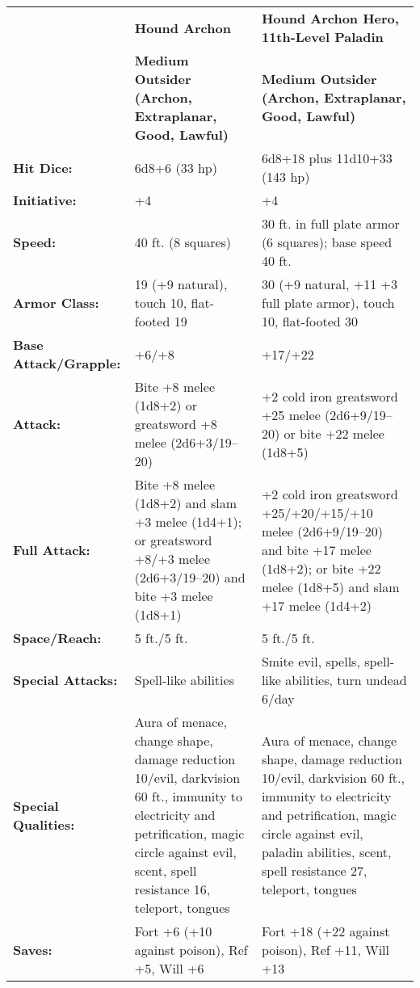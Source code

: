 \documentclass[../main.tex]{subfiles}
\begin{document}
  \begin{table*}[H]
    \centering
    \begin{tabular}{p{9em}p{12em}p{16em}}
       & \textbf{Hound Archon} & \textbf{Hound Archon Hero, 11th-Level Paladin} \\
       & \textbf{Medium Outsider (Archon, Extraplanar, Good, Lawful)} & \textbf{Medium Outsider (Archon, Extraplanar, Good, Lawful)} \\
      \rowcolor[HTML]{FFCE93}
      \textbf{Hit Dice:} & 6d8+6 (33 hp) & 6d8+18 plus 11d10+33 (143 hp) \\
      \textbf{Initiative:} & +4 & +4 \\
      \rowcolor[HTML]{FFCE93}
      \textbf{Speed:} & 40 ft. (8 squares) & 30 ft. in full plate armor (6 squares); base speed 40 ft. \\
      \textbf{Armor Class:} & 19 (+9 natural), touch 10, flat-footed 19 & 30 (+9 natural, +11 +3 full plate armor), touch 10, flat-footed 30 \\
      \rowcolor[HTML]{FFCE93}
      \textbf{Base Attack/Grapple:} & +6/+8 & +17/+22 \\
      \textbf{Attack:} & Bite +8 melee (1d8+2) or greatsword +8 melee (2d6+3/19–20) & +2 cold iron greatsword +25 melee (2d6+9/19–20) or bite +22 melee (1d8+5) \\
      \rowcolor[HTML]{FFCE93}
      \textbf{Full Attack:} & Bite +8 melee (1d8+2) and slam +3 melee (1d4+1); or greatsword +8/+3 melee (2d6+3/19–20) and bite +3 melee (1d8+1) & +2 cold iron greatsword +25/+20/+15/+10 melee (2d6+9/19–20) and bite +17 melee (1d8+2); or bite +22 melee (1d8+5) and slam +17 melee (1d4+2) \\
      \textbf{Space/Reach:} & 5 ft./5 ft. & 5 ft./5 ft. \\
      \rowcolor[HTML]{FFCE93}
      \textbf{Special Attacks:} & Spell-like abilities & Smite evil, spells, spell-like abilities, turn undead 6/day \\
      \textbf{Special Qualities:} & Aura of menace, change shape, damage reduction 10/evil, darkvision 60 ft., immunity to electricity and petrification, magic circle against evil, scent, spell resistance 16, teleport, tongues & Aura of menace, change shape, damage reduction 10/evil, darkvision 60 ft., immunity to electricity and petrification, magic circle against evil, paladin abilities, scent, spell resistance 27, teleport, tongues \\
      \rowcolor[HTML]{FFCE93}
      \textbf{Saves:} & Fort +6 (+10 against poison), Ref +5, Will +6 & Fort +18 (+22 against poison), Ref +11, Will +13 \\

\end{tabular}
\end{table*}
\end{document}
